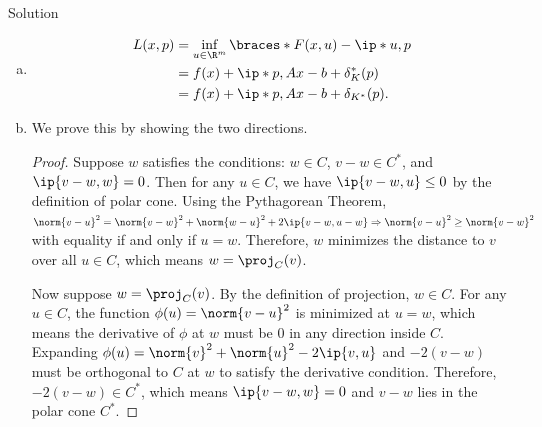\documentclass{article}
\theoremstyle{plain}
\theoremstyle{definition}
\theoremstyle{remark}
\begin{document}
\begin{solution}
    {Solution}
    \begin{enumerate}[(a)]
        \item {
            \begin{align*}
                L(x, p)
                &= \inf_{u\in\R^m} \braces*{F(x,u)-\ip*{u,p}} \\
                &= f(x)+\ip*{p, Ax-b}+\delta_K^*(p) \\
                &= f(x)+\ip*{p, Ax-b}+\delta_{K^*}(p).
            \end{align*}
        }
        \item {We prove this by showing the two directions.
            \begin{proof}
                Suppose $w$ satisfies the conditions: $w\in C$, $v-w\in C^*$, and $\ip{v-w, w}=0$. Then for any $u\in C$, we have $\ip{v-w, u}\leq 0$ by the definition of polar cone. Using the Pythagorean Theorem, $\norm{v-u}^2=\norm{v-w}^2+\norm{w-u}^2+2\ip{v-w, u-w}\Rightarrow\norm{v-u}^2\geq\norm{v-w}^2$ with equality if and only if $u=w$. Therefore, $w$ minimizes the distance to $v$ over all $u\in C$, which means $w=\proj_C(v)$.

                Now suppose $w=\proj_C(v)$. By the definition of projection, $w\in C$. For any $u\in C$, the function $\phi(u)=\norm{v-u}^2$ is minimized at $u=w$, which means the derivative of $\phi$ at $w$ must be $0$ in any direction inside $C$. Expanding $\phi(u)=\norm{v}^2+\norm{u}^2-2\ip{v, u}$ and $-2(v-w)$ must be orthogonal to $C$ at $w$ to satisfy the derivative condition. Therefore, $-2(v-w)\in C^*$, which means $\ip{v-w, w}=0$ and $v-w$ lies in the polar cone $C^*$.


\end{proof}}
\end{enumerate}
\end{solution}
\end{document}
